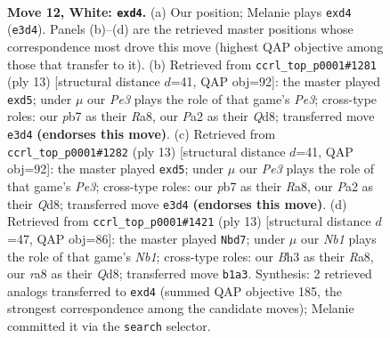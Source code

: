 \documentclass[11pt]{article}
\begin{document}
\clearpage

\begin{figure}[p]\centering
\begin{subfigure}{0.46\textwidth}\centering
\resizebox{\linewidth}{!}{%
\newchessgame
\chessboard[
  setfen={r1bqrk2/pp1nbppp/2n1p3/2p5/2Pp2P1/1P2PN1B/P2P1P1P/RNBQ1RK1 w - - 1 12},
  showmover=false,
  pgfstyle=straightmove, color=movearrow, markmove={e3-d4}
]}
\caption{}
\end{subfigure}\hfill
\begin{subfigure}{0.46\textwidth}\centering
\resizebox{\linewidth}{!}{%
\newchessgame
\chessboard[
  setfen={rnbq1rk1/pp1p1pbp/4pnp1/2pP4/2P5/2N1PN2/PP2BPPP/R1BQK2R b KQ - 1 7},
  showmover=false,
  pgfstyle=straightmove, color=movearrow, markmove={e6-d5}
]}
\caption{}
\end{subfigure}
\\[4pt]
\begin{subfigure}{0.46\textwidth}\centering
\resizebox{\linewidth}{!}{%
\newchessgame
\chessboard[
  setfen={rnbq1rk1/pp1p1pbp/4pnp1/2pP4/2P5/2N1PN2/PP2BPPP/R1BQK2R b KQ - 1 7},
  showmover=false,
  pgfstyle=straightmove, color=movearrow, markmove={e6-d5}
]}
\caption{}
\end{subfigure}\hfill
\begin{subfigure}{0.46\textwidth}\centering
\resizebox{\linewidth}{!}{%
\newchessgame
\chessboard[
  setfen={rnbq1rk1/ppp2pbp/4pnp1/3p4/2PP4/2N1PN2/PP1B1PPP/2RQKB1R b K - 3 7},
  showmover=false,
  pgfstyle=straightmove, color=movearrow, markmove={b8-d7}
]}
\caption{}
\end{subfigure}
\caption{\textbf{Move 12, White: \texttt{exd4}.} (a) Our position; Melanie plays \texttt{exd4} (\texttt{e3d4}). Panels (b)--(d) are the retrieved master positions whose correspondence most drove this move (highest QAP objective among those that transfer to it). (b) Retrieved from \texttt{ccrl\_top\_p0001\#1281} (ply 13) [structural distance $d$=41, QAP obj=92]: the master played \texttt{exd5}; under $\mu$ our \emph{Pe3} plays the role of that game's \emph{Pe3}; cross-type roles: our \emph{p}b7 as their \emph{R}a8, our \emph{P}a2 as their \emph{Q}d8; transferred move \texttt{e3d4} \textbf{(endorses this move)}. (c) Retrieved from \texttt{ccrl\_top\_p0001\#1282} (ply 13) [structural distance $d$=41, QAP obj=92]: the master played \texttt{exd5}; under $\mu$ our \emph{Pe3} plays the role of that game's \emph{Pe3}; cross-type roles: our \emph{p}b7 as their \emph{R}a8, our \emph{P}a2 as their \emph{Q}d8; transferred move \texttt{e3d4} \textbf{(endorses this move)}. (d) Retrieved from \texttt{ccrl\_top\_p0001\#1421} (ply 13) [structural distance $d$=47, QAP obj=86]: the master played \texttt{Nbd7}; under $\mu$ our \emph{Nb1} plays the role of that game's \emph{Nb1}; cross-type roles: our \emph{B}h3 as their \emph{R}a8, our \emph{r}a8 as their \emph{Q}d8; transferred move \texttt{b1a3}. Synthesis: 2 retrieved analogs transferred to \texttt{exd4} (summed QAP objective 185, the strongest correspondence among the candidate moves); Melanie committed it via the \texttt{search} selector.}
\label{fig:thought-m22}
\end{figure}
\end{document}
